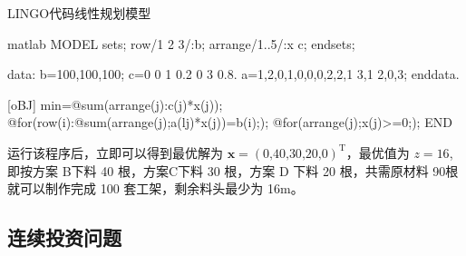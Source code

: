         
        \begin{codebox}{LINGO代码}{线性规划模型}
            \begin{amzcode}{matlab}
                MODEL
                sets;
                row/1 2 3/:b;
                arrange/1..5/:x c;
                endsets;

                data:
                b=100,100,100;
                c=0 0 1 0.2 0 3 0.8.
                a=1,2,0,1,0,0,0,2,2,1 3,1 2,0,3;
                enddata.

                [oBJ] min=@sum(arrange(j):c(j)*x(j));
                @for(row(i):@sum(arrange(j);a(lj)*x(j))=b(i););
                @for(arrange(j);x(j)>=0;);
                END
            \end{amzcode}
        \end{codebox}
        
        运行该程序后，立即可以得到最优解为 $\mathbf{x}=(0\text{,}40\text{,}30\text{,}20\text{,}0)^{\mathrm{T}}$，最优值为 $z=16$,即按方案 B下料 40 根，方案C下料 30 根，方案 D 下料 20 根，共需原材料 90根就可以制作完成 100 套工架，剩余料头最少为 16m。

        \subsection{连续投资问题}
        
